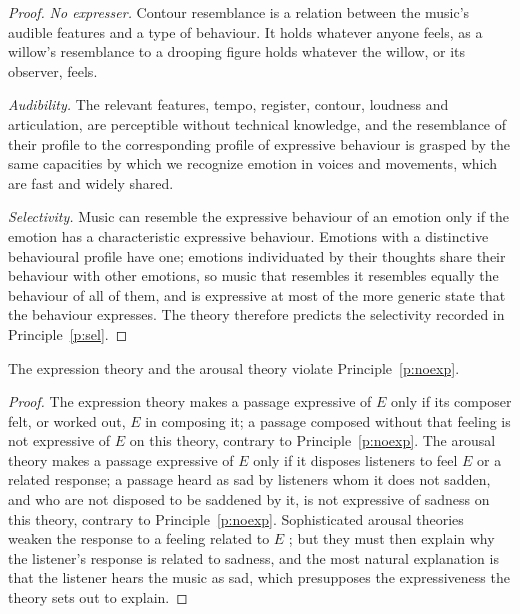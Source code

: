 \documentclass{situationist-preprint}
\begin{document}
\begin{proof}
\emph{No expresser.} Contour resemblance is a relation between the music's audible features and a type of behaviour. It holds whatever anyone feels, as a willow's resemblance to a drooping figure holds whatever the willow, or its observer, feels.

\emph{Audibility.} The relevant features, tempo, register, contour, loudness and articulation, are perceptible without technical knowledge, and the resemblance of their profile to the corresponding profile of expressive behaviour is grasped by the same capacities by which we recognize emotion in voices and movements, which are fast and widely shared.

\emph{Selectivity.} Music can resemble the expressive behaviour of an emotion only if the emotion has a characteristic expressive behaviour. Emotions with a distinctive behavioural profile have one; emotions individuated by their thoughts share their behaviour with other emotions, so music that resembles it resembles equally the behaviour of all of them, and is expressive at most of the more generic state that the behaviour expresses. The theory therefore predicts the selectivity recorded in Principle~\ref{p:sel}.
\end{proof}

\begin{lemma}\label{l:rivals}
The expression theory and the arousal theory violate Principle~\ref{p:noexp}.
\end{lemma}

\begin{proof}
The expression theory makes a passage expressive of $E$ only if its composer felt, or worked out, $E$ in composing it; a passage composed without that feeling is not expressive of $E$ on this theory, contrary to Principle~\ref{p:noexp}. The arousal theory makes a passage expressive of $E$ only if it disposes listeners to feel $E$ or a related response; a passage heard as sad by listeners whom it does not sadden, and who are not disposed to be saddened by it, is not expressive of sadness on this theory, contrary to Principle~\ref{p:noexp}. Sophisticated arousal theories weaken the response to a feeling related to $E$ \citep{Matravers1998}; but they must then explain why the listener's response is related to sadness, and the most natural explanation is that the listener hears the music as sad, which presupposes the expressiveness the theory sets out to explain.
\end{proof}
\end{document}
